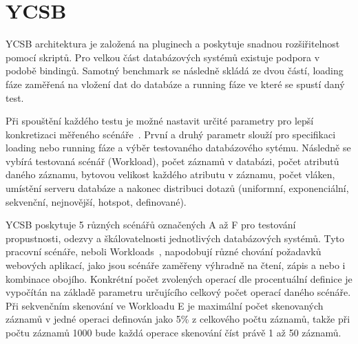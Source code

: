\documentclass[czech,master,dept460,male,csharp,cpdeclaration]{diploma}
\begin{document}
	\section{YCSB}
	
	YCSB architektura je založená na pluginech a poskytuje snadnou rozšiřitelnost pomocí skriptů. Pro velkou část databázových systémů existuje podpora v podobě bindingů. Samotný benchmark se následně skládá ze dvou částí, loading fáze zaměřená na vložení dat do databáze a running fáze ve které se spustí daný test.
	
	Při spouštění každého testu je možné nastavit určité parametry pro lepší konkretizaci měřeného scénáře~\cite{ytb-ycsb}. První a druhý parametr slouží pro specifikaci loading nebo running fáze a výběr testovaného databázového sytému. Následně se vybírá testovaná scénář (Workload), počet záznamů v databázi, počet atributů daného záznamu, bytovou velikost každého atributu v záznamu, počet vláken, umístění serveru databáze a nakonec distribuci dotazů (uniformní, exponenciální, sekvenční, nejnovější, hotspot, definované).
	
	YCSB poskytuje 5 různých scénářů označených A až F pro testování propustnosti, odezvy a škálovatelnosti jednotlivých databázových systémů. Tyto pracovní scénáře, neboli Workloads~\cite{benchmark-pdf-1, workloads}, napodobují různé chování požadavků webových aplikací, jako jsou scénáře zaměřeny výhradně na čtení, zápis a nebo i kombinace obojího. Konkrétní počet zvolených operací dle procentuální definice je vypočítán na základě parametru určujícího celkový počet operací daného scénáře. Při sekvenčním skenování ve Workloadu E je maximální počet skenovaných záznamů v jedné operaci definován jako 5\% z celkového počtu záznamů, takže při počtu záznamů 1000 bude každá operace skenování číst právě 1 až 50 záznamů.
	
\end{document}
